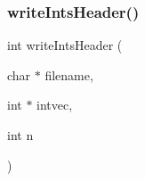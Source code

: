 \label{lib__util_8c_a90cda0201d5b07c354fbf099d5a3e2ca} 
\subsubsection{write\+Ints\+Header()}
{\footnotesize\ttfamily int write\+Ints\+Header (\begin{DoxyParamCaption}\item[{char $\ast$}]{filename,  }\item[{int $\ast$}]{intvec,  }\item[{int}]{n }\end{DoxyParamCaption})}

